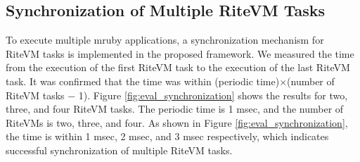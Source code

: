 \documentclass[conference]{IEEEtran/IEEEtran/IEEEtran}
\begin{document}

\subsection{Synchronization of Multiple RiteVM Tasks}
To execute multiple mruby applications, a synchronization mechanism for RiteVM tasks is implemented in the proposed framework.
We measured the time from the execution of the first RiteVM task to the execution of the last RiteVM task.
It was confirmed that the time was within (periodic time)$\times$(number of RiteVM tasks $-$ 1).
Figure \ref{fig:eval_synchronization} shows the results for two, three, and four RiteVM tasks.
The periodic time is 1 msec, and the number of RiteVMs is two, three, and four.
As shown in Figure \ref{fig:eval_synchronization}, the time is within 1 msec, 2 msec, and 3 msec respectively, which indicates successful synchronization of multiple RiteVM tasks.
\end{document}
